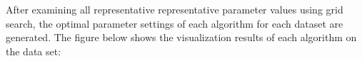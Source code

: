 After examining all representative representative parameter values using grid search, the optimal parameter settings of each algorithm for each dataset are generated. The figure below shows the visualization results of each algorithm on the data set:


\begin{figure}[H]
\centering  %
\end{figure}

